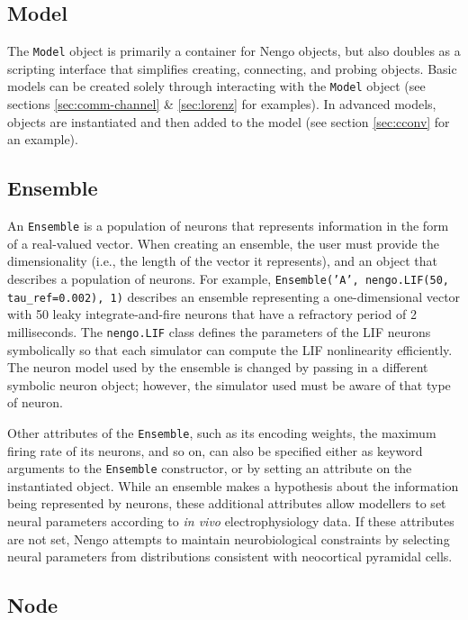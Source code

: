 \documentclass{frontiersSCNS}
\begin{document}
\subsection{Model}

The \texttt{Model} object is primarily a container
for Nengo objects,
but also doubles as a scripting interface
that simplifies creating, connecting,
and probing objects.
Basic models
can be created solely through interacting
with the \texttt{Model} object
(see sections \ref{sec:comm-channel} \& \ref{sec:lorenz}
for examples).
In advanced models,
objects are instantiated
and then added to the model
(see section \ref{sec:cconv} for an example).

\subsection{Ensemble}

An \texttt{Ensemble} is
a population of neurons
that represents information
in the form of a real-valued vector.
When creating an ensemble,
the user must provide the dimensionality
(i.e., the length of the vector it represents),
and an object that describes
a population of neurons.
For example, \texttt{Ensemble('A', nengo.LIF(50, tau\_ref=0.002), 1)}
describes an ensemble representing a one-dimensional vector
with 50 leaky integrate-and-fire neurons \cite{TODO} %
that have a refractory period of 2 milliseconds.
The \texttt{nengo.LIF} class defines
the parameters of the LIF neurons symbolically
so that each simulator can compute
the LIF nonlinearity efficiently.
The neuron model used by the ensemble
is changed by passing in a different symbolic neuron object;
however, the simulator used must be aware
of that type of neuron.

Other attributes of the \texttt{Ensemble},
such as its encoding weights,
the maximum firing rate of its neurons,
and so on, can also be specified
either as keyword arguments
to the \texttt{Ensemble} constructor,
or by setting an attribute on the instantiated object.
While an ensemble makes a hypothesis
about the information being represented by neurons,
these additional attributes
allow modellers to set
neural parameters according to \textit{in vivo}
electrophysiology data.
If these attributes are not set,
Nengo attempts to maintain
neurobiological constraints
by selecting neural parameters
from distributions consistent with
neocortical pyramidal cells.

\subsection{Node}
\end{document}
